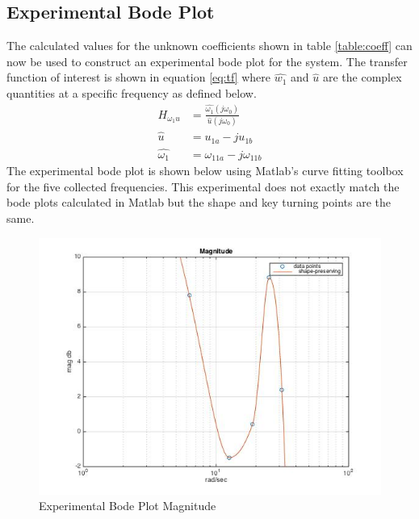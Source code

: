 \documentclass[11pt,titlepage]{article}
\begin{document}
	\subsection{Experimental Bode Plot} \label{sec:bode}
		The calculated values for the unknown coefficients shown in table \ref{table:coeff} can now be used to construct an experimental bode plot for the system. The transfer function of interest is shown in equation \ref{eq:tf} where $\hat{w_1}$ and $\hat{u}$ are the complex quantities at a specific frequency as defined below.
		\begin{align}
			H_{\omega_1u} &= \frac{\hat{\omega_1}(j\omega_0)}{\hat{u}(j\omega_0)} \label{eq:tf} \\[1em]
			\hat{u} &= u_{1a} - ju_{1b} \\[1em]
			\hat{\omega_1} &= \omega_{11a} - j\omega_{11b}
		\end{align}
		The experimental bode plot is shown below using Matlab's curve fitting toolbox for the five collected frequencies. This experimental does not exactly match the bode plots calculated in Matlab but the shape and key turning points are the same.
		\begin{figure}[H]
			\centering
			\includegraphics[scale=0.6]{experimentalBodeMag}
			\caption{Experimental Bode Plot Magnitude}
		\end{figure}
\end{document}
